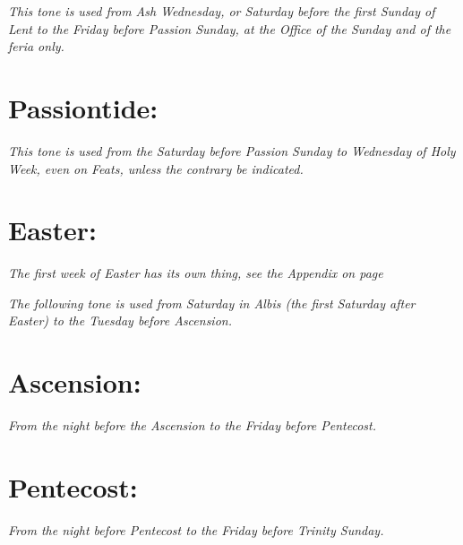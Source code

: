 \documentclass[a5paper,12pt,twoside,openany,oldfontcommands]{memoir}
\newcommand\rubrics[1]{\textit{#1}}
\begin{document}
\rubrics{This tone is used from Ash Wednesday, or Saturday before the first Sunday of Lent to the Friday before Passion Sunday, at the Office of the Sunday and of the feria only.}


\goodbreak


\section{Passiontide:}

\rubrics{This tone is used from the Saturday before Passion Sunday to Wednesday of Holy Week, even on Feats, unless the contrary be indicated.}


\goodbreak


\section{Easter:}

\rubrics{The first week of Easter has its own thing, see the Appendix on page \pageref{EasterOctave}}

\rubrics{The following tone is used from Saturday in Albis (the first Saturday after Easter) to the Tuesday before Ascension.}


\goodbreak


\section{Ascension:}

\rubrics{From the night before the Ascension to the Friday before Pentecost.}


\goodbreak


\section{Pentecost:}

\rubrics{From the night before Pentecost to the Friday before Trinity Sunday.}


\end{document}
